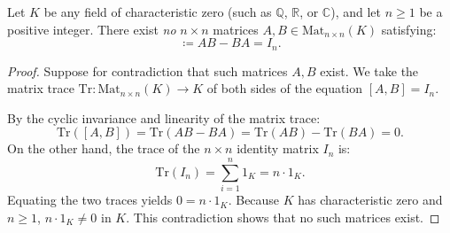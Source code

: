 \begin{theorem}
\label{thm:no_go}
Let $K$ be any field of characteristic zero (such as $\mathbb{Q}$, $\mathbb{R}$, or $\mathbb{C}$), and let $n \ge 1$ be a positive integer. There exist \emph{no} $n \times n$ matrices $A, B \in \mathrm{Mat}_{n \times n}(K)$ satisfying:
\begin{equation}
[A, B] \coloneqq A B - B A = I_n.
\end{equation}
\end{theorem}

\begin{proof}
Suppose for contradiction that such matrices $A, B$ exist. We take the matrix trace $\mathrm{Tr} : \mathrm{Mat}_{n \times n}(K) \to K$ of both sides of the equation $[A, B] = I_n$.

By the cyclic invariance and linearity of the matrix trace:
\begin{equation}
\mathrm{Tr}([A, B]) = \mathrm{Tr}(A B - B A) = \mathrm{Tr}(A B) - \mathrm{Tr}(B A) = 0.
\end{equation}
On the other hand, the trace of the $n \times n$ identity matrix $I_n$ is:
\begin{equation}
\mathrm{Tr}(I_n) = \sum_{i=1}^n 1_K = n \cdot 1_K.
\end{equation}
Equating the two traces yields $0 = n \cdot 1_K$.
Because $K$ has characteristic zero and $n \ge 1$, $n \cdot 1_K \neq 0$ in $K$. This contradiction shows that no such matrices exist.
\end{proof}

